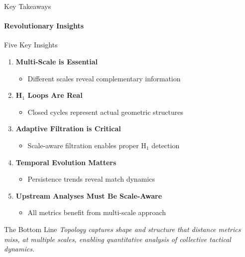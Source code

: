\documentclass[aspectratio=169]{beamer}
\newcommand{\highlight}[1]{\textcolor{accentorange}{\textbf{#1}}}
\begin{document}
\begin{frame}{Key Takeaways}
\framesubtitle{Revolutionary Insights}

\begin{block}{Five Key Insights}
\begin{enumerate}
    \item \highlight{Multi-Scale is Essential}
    \begin{itemize}
        \item Different scales reveal complementary information
    \end{itemize}
    
    \item \highlight{H$_1$ Loops Are Real}
    \begin{itemize}
        \item Closed cycles represent actual geometric structures
    \end{itemize}
    
    \item \highlight{Adaptive Filtration is Critical}
    \begin{itemize}
        \item Scale-aware filtration enables proper H$_1$ detection
    \end{itemize}
    
    \item \highlight{Temporal Evolution Matters}
    \begin{itemize}
        \item Persistence trends reveal match dynamics
    \end{itemize}
    
    \item \highlight{Upstream Analyses Must Be Scale-Aware}
    \begin{itemize}
        \item All metrics benefit from multi-scale approach
    \end{itemize}
\end{enumerate}
\end{block}

\vspace{0.3cm}
\begin{block}{The Bottom Line}
\centering
\Large
\textit{Topology captures shape and structure that distance metrics miss, at multiple scales, enabling quantitative analysis of collective tactical dynamics.}
\end{block}
\end{frame}
\end{document}
